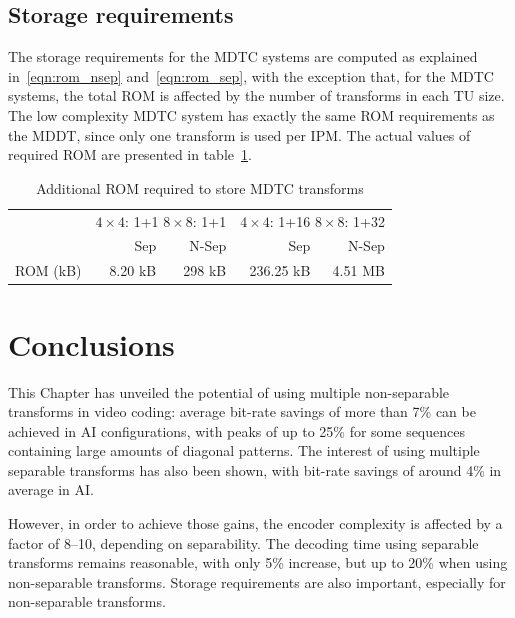 \documentclass[11pt,a4paper,openright,twoside]{book}
\numberwithin{equation}{section} %
\numberwithin{figure}{section} %
\numberwithin{table}{section} %
\begin{document}
\subsection{Storage requirements}
\label{sub:mdtc_storage_requirements}

The storage requirements for the \ac{MDTC} systems are computed as explained
in~\eqref{eqn:rom_nsep} and~\eqref{eqn:rom_sep}, with the exception that, for
the \ac{MDTC} systems, the total \acs{ROM} is affected by the number of
transforms in each \ac{TU} size.
The low complexity \ac{MDTC} system has exactly the same \acs{ROM}
requirements as the \ac{MDDT}, since only one transform is used per \ac{IPM}.
The actual values of required \acs{ROM} are presented in
table~\ref{tab:mdtc_rom}.

\begin{table}
	\centering
	\small
	\begin{tabular}{l|rr|rr}
		\multicolumn{1}{c|}{} &
		\multicolumn{2}{c|}{\multirow{2}{2cm}{\centering $4\times4$: 1+1 $8\times8$: 1+1}} &
		\multicolumn{2}{c}{\multirow{2}{2cm}{\centering $4\times4$: 1+16 $8\times8$: 1+32}} \\
		& & & & \\
		\cline{2-5}
		& Sep & N-Sep & Sep & N-Sep \\
		\hline
		\hline
		\acs{ROM} (kB)   & 8.20 kB & 298 kB & 236.25 kB & 4.51 MB \\
	\end{tabular}
	\caption{Additional \acs{ROM} required to store \acs{MDTC} transforms}
	\label{tab:mdtc_rom}
\end{table}

\section{Conclusions}
\label{sec:mdtc_conclusions}

This Chapter has unveiled the potential of using multiple non-separable
transforms in video coding:
average bit-rate savings of more than 7\% can be achieved in \ac{AI}
configurations, with peaks of up to 25\% for some sequences containing large
amounts of diagonal patterns.
The interest of using multiple separable transforms has also been shown, with
bit-rate savings of around 4\% in average in \ac{AI}.

However, in order to achieve those gains, the encoder complexity is affected
by a factor of 8--10, depending on separability.
The decoding time using separable transforms remains reasonable, with only 5\%
increase, but up to 20\% when using non-separable transforms.
Storage requirements are also important, especially for non-separable
transforms.
\end{document}
